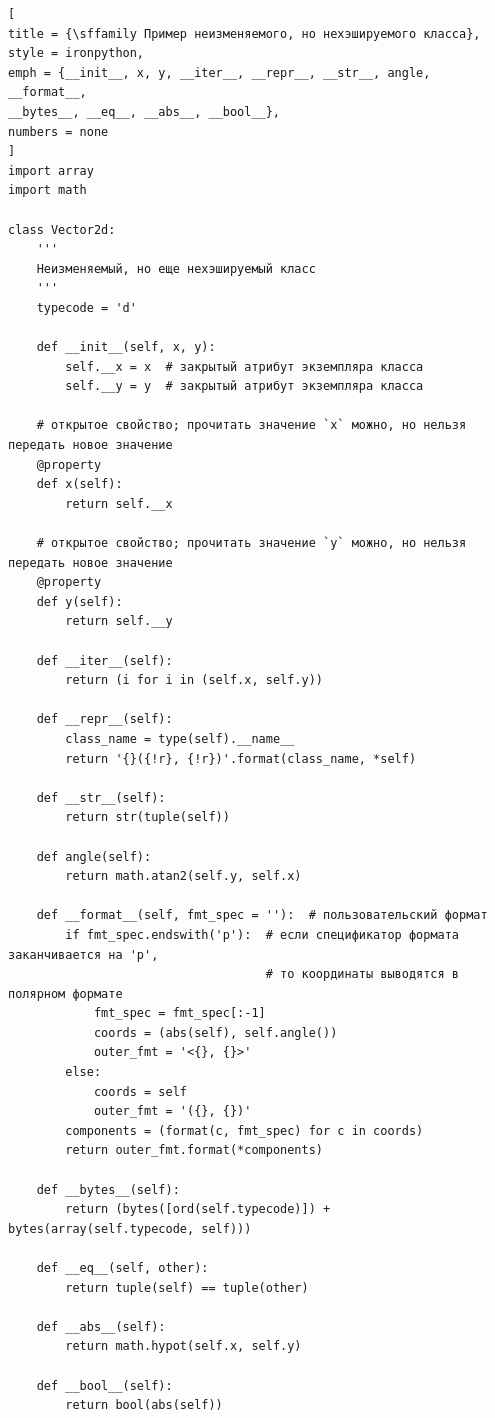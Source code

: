 \documentclass[%
	11pt,
	a4paper,
	utf8,
		]{article}
\begin{document}
\begin{lstlisting}[
title = {\sffamily Пример неизменяемого, но нехэшируемого класса},
style = ironpython,
emph = {__init__, x, y, __iter__, __repr__, __str__, angle, __format__,
__bytes__, __eq__, __abs__, __bool__},
numbers = none
]
import array
import math

class Vector2d:
    '''
    Неизменяемый, но еще нехэшируемый класс
    '''
    typecode = 'd'

    def __init__(self, x, y):
        self.__x = x  # закрытый атрибут экземпляра класса
        self.__y = y  # закрытый атрибут экземпляра класса

    # открытое свойство; прочитать значение `x` можно, но нельзя передать новое значение
    @property  
    def x(self):
        return self.__x

    # открытое свойство; прочитать значение `y` можно, но нельзя передать новое значение
    @property  
    def y(self):
        return self.__y

    def __iter__(self):
        return (i for i in (self.x, self.y))

    def __repr__(self):
        class_name = type(self).__name__
        return '{}({!r}, {!r})'.format(class_name, *self)

    def __str__(self):
        return str(tuple(self))

    def angle(self):
        return math.atan2(self.y, self.x)

    def __format__(self, fmt_spec = ''):  # пользовательский формат
        if fmt_spec.endswith('p'):  # если спецификатор формата заканчивается на 'p',
                                    # то координаты выводятся в полярном формате
            fmt_spec = fmt_spec[:-1]
            coords = (abs(self), self.angle())
            outer_fmt = '<{}, {}>'
        else:
            coords = self
            outer_fmt = '({}, {})'
        components = (format(c, fmt_spec) for c in coords)
        return outer_fmt.format(*components)

    def __bytes__(self):
        return (bytes([ord(self.typecode)]) + bytes(array(self.typecode, self)))

    def __eq__(self, other):
        return tuple(self) == tuple(other)

    def __abs__(self):
        return math.hypot(self.x, self.y)

    def __bool__(self):
        return bool(abs(self))
\end{lstlisting}
\end{document}
